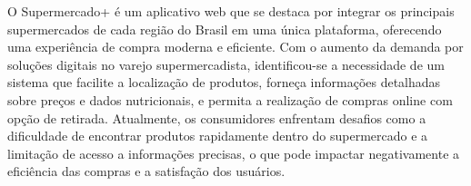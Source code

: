 \hspace{4.5mm}
O Supermercado+ é um aplicativo web que se destaca por integrar os principais supermercados de cada região do Brasil em uma única plataforma, oferecendo uma experiência de compra moderna e eficiente. Com o aumento da demanda por soluções digitais no varejo supermercadista, identificou-se a necessidade de um sistema que facilite a localização de produtos, forneça informações detalhadas sobre preços e dados nutricionais, e permita a realização de compras online com opção de retirada. Atualmente, os consumidores enfrentam desafios como a dificuldade de encontrar produtos rapidamente dentro do supermercado e a limitação de acesso a informações precisas, o que pode impactar negativamente a eficiência das compras e a satisfação dos usuários.